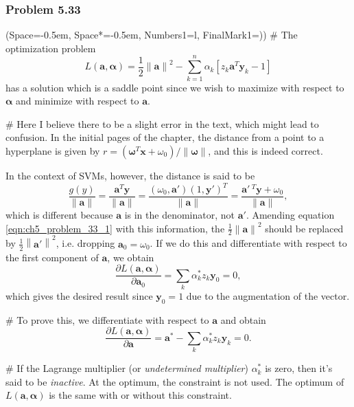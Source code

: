 \documentclass[12pt, a4paper]{article}
\newcommand{\listSpace}{-0.5em}%
\newcommand{\vect}[1]{\bm{#1}}
\newcommand{\norm}[1]{\left\lVert#1\right\rVert}
\begin{document}
{\subsubsection*{Problem 5.33}
\begin{easylist}[enumerate]
\ListProperties(Space=\listSpace, Space*=\listSpace, Numbers1=l, FinalMark1={)})
# The optimization problem
\begin{equation}
\label{eqn:ch5_problem_33_1}
	L(\vect{a}, \vect{\alpha}) = \frac{1}{2} \norm{\vect{a}}^2 -
	\sum_{k=1}^{n} \alpha_k \left[ z_k \vect{a}^T \vect{y}_k - 1 \right]
\end{equation}
has a solution which is a saddle point since we wish to maximize with respect to $\vect{\alpha}$ and minimize with respect to $\vect{a}$.

# Here I believe there to be a slight error in the text, which might lead to confusion.
In the initial pages of the chapter, the distance from a point to a hyperplane is given by $r = (\vect{\omega}^T \vect{x} + \omega_0) / \norm{\vect{\omega}}$, and this is indeed correct.

In the context of SVMs, however, the distance is said to be 
\begin{equation*}
	\frac{g(y)}{\norm{\vect{a}}}
	=
	\frac{\vect{a} ^T \vect{y}}{\norm{\vect{a}}}
	=
	\frac{(\omega_0, \vect{a}') (1, \vect{y}')^T}{\norm{\vect{a}}}
	=
	\frac{\vect{a}'\,^T\vect{y} + \omega_0}{\norm{\vect{a}}},
\end{equation*}
which is different because $\vect{a}$ is in the denominator, not $\vect{a}'$.
Amending equation \eqref{eqn:ch5_problem_33_1} with this information, the $\frac{1}{2} \norm{\vect{a}}^2$ should be replaced by $\frac{1}{2} \norm{\vect{a}'}^2$, i.e. dropping $\vect{a}_0 = \omega_0$.
If we do this and differentiate with respect to the first component of $\vect{a}$, we obtain
\begin{equation*}
	\frac{\partial L(\vect{a}, \vect{\alpha})}{\partial \vect{a}_0}
	=
	\sum_k \alpha_k^* z_k \vect{y}_0 = 0,
\end{equation*}
which gives the desired result since $\vect{y}_0 = 1$ due to the augmentation of the vector.

# To prove this, we differentiate with respect to $\vect{a}$ and obtain
\begin{equation*}
\frac{\partial L(\vect{a}, \vect{\alpha})}{\partial \vect{a}}
=
\vect{a}^* - \sum_k \alpha_k^* z_k \vect{y}_k = 0.
\end{equation*}

# If the Lagrange multiplier (or \emph{undetermined multiplier}) $\alpha_k^*$ is zero, then it's said to be \emph{inactive}.
At the optimum, the constraint is not used.
The optimum of $L(\vect{a}, \vect{\alpha})$ is the same with or without this constraint.


\end{easylist}}
\end{document}
